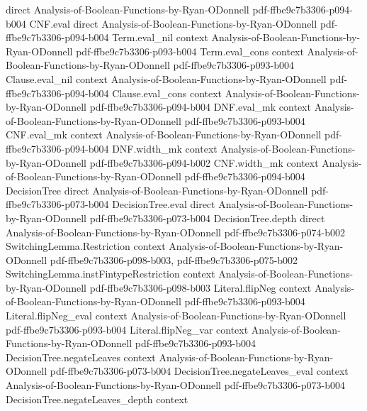 \begin{theorem}
  {direct}
  {Analysis-of-Boolean-Functions-by-Ryan-ODonnell}
  {pdf-ffbe9c7b3306-p094-b004}
\proofstep
  {CNF.eval}
  {direct}
  {Analysis-of-Boolean-Functions-by-Ryan-ODonnell}
  {pdf-ffbe9c7b3306-p094-b004}
\proofstep
  {Term.eval_nil}
  {context}
  {Analysis-of-Boolean-Functions-by-Ryan-ODonnell}
  {pdf-ffbe9c7b3306-p093-b004}
\proofstep
  {Term.eval_cons}
  {context}
  {Analysis-of-Boolean-Functions-by-Ryan-ODonnell}
  {pdf-ffbe9c7b3306-p093-b004}
\proofstep
  {Clause.eval_nil}
  {context}
  {Analysis-of-Boolean-Functions-by-Ryan-ODonnell}
  {pdf-ffbe9c7b3306-p094-b004}
\proofstep
  {Clause.eval_cons}
  {context}
  {Analysis-of-Boolean-Functions-by-Ryan-ODonnell}
  {pdf-ffbe9c7b3306-p094-b004}
\proofstep
  {DNF.eval_mk}
  {context}
  {Analysis-of-Boolean-Functions-by-Ryan-ODonnell}
  {pdf-ffbe9c7b3306-p093-b004}
\proofstep
  {CNF.eval_mk}
  {context}
  {Analysis-of-Boolean-Functions-by-Ryan-ODonnell}
  {pdf-ffbe9c7b3306-p094-b004}
\proofstep
  {DNF.width_mk}
  {context}
  {Analysis-of-Boolean-Functions-by-Ryan-ODonnell}
  {pdf-ffbe9c7b3306-p094-b002}
\proofstep
  {CNF.width_mk}
  {context}
  {Analysis-of-Boolean-Functions-by-Ryan-ODonnell}
  {pdf-ffbe9c7b3306-p094-b004}
\proofstep
  {DecisionTree}
  {direct}
  {Analysis-of-Boolean-Functions-by-Ryan-ODonnell}
  {pdf-ffbe9c7b3306-p073-b004}
\proofstep
  {DecisionTree.eval}
  {direct}
  {Analysis-of-Boolean-Functions-by-Ryan-ODonnell}
  {pdf-ffbe9c7b3306-p073-b004}
\proofstep
  {DecisionTree.depth}
  {direct}
  {Analysis-of-Boolean-Functions-by-Ryan-ODonnell}
  {pdf-ffbe9c7b3306-p074-b002}
\proofstep
  {SwitchingLemma.Restriction}
  {context}
  {Analysis-of-Boolean-Functions-by-Ryan-ODonnell}
  {pdf-ffbe9c7b3306-p098-b003,
    pdf-ffbe9c7b3306-p075-b002}
\proofstep
  {SwitchingLemma.instFintypeRestriction}
  {context}
  {Analysis-of-Boolean-Functions-by-Ryan-ODonnell}
  {pdf-ffbe9c7b3306-p098-b003}
\proofstep
  {Literal.flipNeg}
  {context}
  {Analysis-of-Boolean-Functions-by-Ryan-ODonnell}
  {pdf-ffbe9c7b3306-p093-b004}
\proofstep
  {Literal.flipNeg_eval}
  {context}
  {Analysis-of-Boolean-Functions-by-Ryan-ODonnell}
  {pdf-ffbe9c7b3306-p093-b004}
\proofstep
  {Literal.flipNeg_var}
  {context}
  {Analysis-of-Boolean-Functions-by-Ryan-ODonnell}
  {pdf-ffbe9c7b3306-p093-b004}
\proofstep
  {DecisionTree.negateLeaves}
  {context}
  {Analysis-of-Boolean-Functions-by-Ryan-ODonnell}
  {pdf-ffbe9c7b3306-p073-b004}
\proofstep
  {DecisionTree.negateLeaves_eval}
  {context}
  {Analysis-of-Boolean-Functions-by-Ryan-ODonnell}
  {pdf-ffbe9c7b3306-p073-b004}
\proofstep
  {DecisionTree.negateLeaves_depth}
  {context}

\end{theorem}
